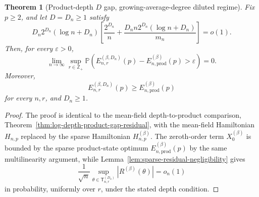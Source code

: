 \documentclass[12pt]{article}
\newtheorem{theorem}{Theorem}
\renewcommand{\P}{\mathbb{P}}
\begin{document}
\begin{theorem}[Product-depth $D$ gap, growing-average-degree diluted regime]
\label{thm:sparse-log-depth-product-gap}
Fix \(p\ge2\), and let \(D=D_n \ge 1\) satisfy
\[
D_n2^{D_n}(\log n+D_n)
\left[
\frac{2^{D_n}}{n}
+
\frac{D_n n2^{D_n}(\log n+D_n)}{m_n}
\right]
=o(1).
\]
Then, for every \(\varepsilon>0\),
\[
\lim_{n\to\infty}
\sup_{r\in\mathbb Z_+}
\P\left(
E_{n,r}^{(\beta,D_n)}(p)
-
E_{n,\mathrm{prod}}^{(\beta)}(p)
>
\varepsilon
\right)
=0.
\]
Moreover,
\[
E_{n,r}^{(\beta,D_n)}(p)\ge E_{n,\mathrm{prod}}^{(\beta)}(p)
\]
for every \(n,r\), and \(D_n\ge1\).
\end{theorem}

\begin{proof}
The proof is identical to the mean-field depth-to-product comparison,
Theorem~\ref{thm:log-depth-product-gap-residual}, with the mean-field Hamiltonian
\(H_{n,p}\) replaced by the sparse Hamiltonian \(H_{n,p}^{(\beta)}\). The
zeroth-order term \(X_0^{(\beta)}\) is bounded by the sparse product-state
optimum \(E_{n,\mathrm{prod}}^{(\beta)}(p)\) by the same multilinearity
argument, while Lemma~\ref{lem:sparse-residual-negligibility} gives
\[
\frac1{\sqrt n}
\sup_{\theta\in\mathsf{T}_{n,r}^{(D_n)}}
|R^{(\beta)}(\theta)|
=
o_n(1)
\]
in probability, uniformly over $r$, under the stated depth condition.
\end{proof}
\end{document}
